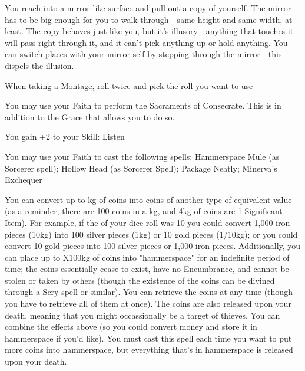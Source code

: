 {You reach into a mirror-like surface and pull out a copy of yourself.  The mirror has to be big enough for you to walk through - same height and same width, at least.  The copy behaves just like you, but it's illusory - anything that touches it will pass right through it, and it can't pick anything up or hold anything.  You can switch places with your mirror-self by stepping through the mirror - this dispels the illusion.




\GOD[
Name=Gomorrah,
Link=small-god-gomorrah,
GodOf=Archfiend of Cities,
Holy=a single iron nail driven into the hand or wrist
]


When taking a Montage, roll twice and pick the roll you want to use


You may use your Faith to perform the Sacraments of Consecrate. This is in addition to the Grace that allows you to do so.




\GOD[
Name=Minerva,
Link=small-god-minerva,
GodOf=Archon of Trade and Commerce,
Holy=a knotted string hung from the belt - useful for counting (like an abacus)
]


You gain +2 to your Skill: Listen


You may use your Faith to cast the following spells: Hammerspace Mule (as Sorcerer spell); Hollow Head (as Sorcerer Spell); Package Neatly; Minerva's Exchequer


\LITURGY [
  Name= Minerva's Exchequer,
  Link= minerva-liturgy-minervas-exchequer,
  Paradigm= Entropy ,
  Save=  N ,
  Duration= n/a ,
  Counter=  n/a  ,
  Keywords= Hammerspace ,
  Target=   Close coins
]



You can convert up to \SUMDICE kg of coins into coins of another type of equivalent value (as a reminder, there are 100 coins in a kg, and 4kg of coins are 1 Significant Item).
For example, if the \SUMDICE of your dice roll was 10 you could convert 1,000 iron pieces (10kg) into 100 silver pieces (1kg) or 10 gold pieces (1/10kg); or you could convert 10 gold pieces into 100 silver pieces or 1,000 iron pieces.
Additionally, you can place up to \DICE X100kg of coins into "hammerspace" for an indefinite period of time; the coins essentially cease to exist, have no Encumbrance, and cannot be stolen or taken by others (though the existence of the coins can be divined through a Scry spell or similar).  You can retrieve the coins at any time (though you have to retrieve all of them at once).  The coins are also released upon your death, meaning that you might occassionally be a target of thieves.
You can combine the effects above (so you could convert money and store it in hammerspace if you'd like).  You must cast this spell each time you want to put more coins into hammerspace, but everything that's in hammerspace is released upon your death.

}
